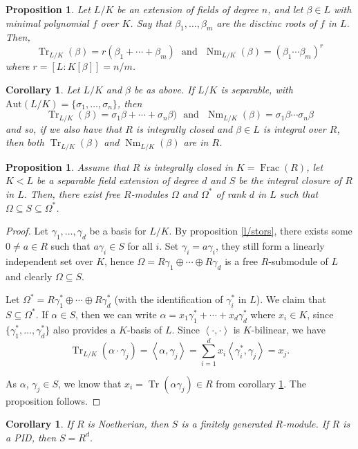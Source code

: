 \documentclass{tufte-handout} %
\newtheorem{cor}[thm]{Corollary}
\newtheorem{prop}[thm]{Proposition}
\theoremstyle{definition}
\theoremstyle{remark}
\DeclareMathOperator{\ff}{Frac}
\DeclareMathOperator{\Tr}{Tr}
\DeclareMathOperator{\Nm}{Nm}
\newcommand{\inp}[2]{\left\langle #1, #2 \right\rangle}
\begin{document}
\begin{prop}
    Let $L/K$ be an extension of fields of degree $n$, and let $\beta \in L$ with minimal polynomial $f$ over $K$. Say that $\beta_1, \ldots, \beta_m$ are the disctinc roots of $f$ in $L$. Then,
    \[
        \Tr_{L/K}(\beta) = r(\beta_1 + \cdots + \beta_m) \ \ \ \text{and} \ \ \ \Nm_{L/K}(\beta) = (\beta_1 \cdots \beta_m)^r
    \]
    where $r = [L : K[\beta]] = n/m$.
\end{prop}
\begin{cor}\label{intTrNm}
    Let $L/K$ and $\beta$ be as above. If $L/K$ is separable, with $\mathrm{Aut}(L/K) = \{\sigma_1, \ldots, \sigma_n\}$, then
    \[
        \Tr_{L/K}(\beta) = \sigma_1\beta + \cdots + \sigma_n\beta) \ \ \ \text{and} \ \ \ \Nm_{L/K}(\beta) = \sigma_1\beta \cdots \sigma_n\beta
    \]
    and so, if we also have that $R$ is integrally closed and $\beta \in L$ is integral over $R$, then both $\Tr_{L/K}(\beta)$ and $\Nm_{L/K}(\beta)$ are in $R$.
\end{cor}
\begin{prop}\label{fingenint}
	Assume that $R$ is integrally closed in $K = \ff(R)$, let $K < L$ be a separable field extension of degree $d$ and $S$ be the integral closure of $R$ in $L$. Then, there exist free $R$-modules $\Omega$ and $\Omega^*$ of rank $d$ in $L$ such that $\Omega \subseteq S \subseteq \Omega^*$.
\end{prop}
\begin{proof}
	Let $\gamma_1, \dots, \gamma_d$ be a basis for $L/K$. By proposition \ref{l/stors}, there exists some $0\neq a \in R$ such that $a\gamma_i \in S$ for all $i$. Set $\gamma_i = a\gamma_i$, they still form a linearly independent set over $K$, hence $\Omega = R\gamma_1 \oplus \cdots \oplus R\gamma_d$ is a free $R$-submodule of $L$ and clearly $\Omega \subseteq S$.
	
	Let $\Omega^* = R\gamma_1^* \oplus \cdots \oplus R\gamma_d^*$ (with the identification of $\gamma_i^*$ in $L$). We claim that $S \subseteq \Omega^*$. If $\alpha \in S$, then we can write $\alpha = x_1\gamma_1^* + \cdots + x_d\gamma_d^*$ where $x_i \in K$, since $\{\gamma_1^*, \ldots, \gamma_d^*\}$ also provides a $K$-basis of $L$. Since $\inp{\cdot}{\cdot}$ is $K$-bilinear, we have 
	\[
	    \Tr_{L/K}(\alpha \cdot \gamma_j) = \inp{\alpha}{\gamma_j} = \sum_{i=1}^d x_i\inp{\gamma_i^*}{\gamma_j} = x_j.
	\]
	
	As $\alpha$, $\gamma_j \in S$, we know that $x_i = \Tr(\alpha \gamma_j) \in R$ from corollary \ref{intTrNm}. The proposition follows.
\end{proof}
\begin{cor}
	If $R$ is Noetherian, then $S$ is a finitely generated $R$-module. If $R$ is a PID, then $S = R^d$.
\end{cor} %
\end{document}
